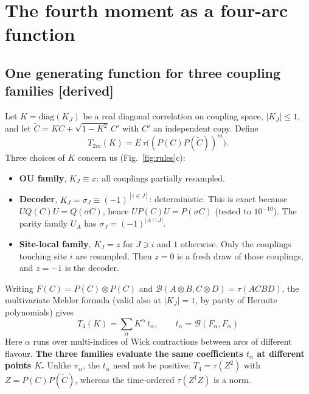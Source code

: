 \documentclass[11pt]{article}
\newcommand{\tagbox}[2]{\textsf{\small\color{#1}[#2]}}
\newcommand{\DER}{\tagbox{cder}{derived}}
\theoremstyle{remark}
\begin{document}
\FloatBarrier
\section{The fourth moment as a four-arc function}\label{sec:fourarc}
\subsection{One generating function for three coupling families \DER}
Let $K=\mathrm{diag}(K_J)$ be a real diagonal correlation on coupling space, $|K_J|\le1$, and let
$\tilde C=KC+\sqrt{1-K^2}\,C'$ with $C'$ an independent copy. Define
\begin{equation}
T_{2m}(K)=E\,\tau\big((P(C)P(\tilde C))^m\big).
\end{equation}
Three choices of $K$ concern us (Fig.~\ref{fig:rules}c):
\begin{itemize}\itemsep1pt
\item \textbf{OU family}, $K_J\equiv x$: all couplings partially resampled.
\item \textbf{Decoder}, $K_J=\sigma_J\equiv(-1)^{[i\in J]}$: deterministic. This is exact because $UQ(C)U=Q(\sigma C)$, hence
  $UP(C)U=P(\sigma C)$ (tested to $10^{-10}$). The parity family $U_A$ has $\sigma_J=(-1)^{|A\cap J|}$.
\item \textbf{Site-local family}, $K_J=z$ for $J\ni i$ and $1$ otherwise. Only the couplings touching site $i$ are
  resampled. Then $z=0$ is a fresh draw of those couplings, and $z=-1$ is the decoder.
\end{itemize}
Writing $F(C)=P(C)\otimes P(C)$ and $\mathcal B(A\otimes B,C\otimes D)=\tau(ACBD)$, the multivariate Mehler formula
(valid also at $|K_J|=1$, by parity of Hermite polynomials) gives
\begin{equation}
\boxed{\;T_4(K)=\sum_\alpha K^\alpha\,t_\alpha,\qquad t_\alpha=\mathcal B(F_\alpha,F_\alpha)\;}
\label{eq:genfun}
\end{equation}
Here $\alpha$ runs over multi-indices of Wick contractions between arcs of different flavour. \textbf{The three
families evaluate the same coefficients $t_\alpha$ at different points $K$.} Unlike $\pi_n$, the $t_\alpha$ need not be
positive: $T_4=\tau(Z^2)$ with $Z=P(C)P(\tilde C)$, whereas the time-ordered $\tau(Z^\dagger Z)$ is a norm.
\end{document}
